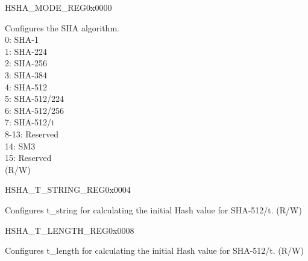 \begin{register}{H}{SHA\_MODE\_REG}{0x0000}\label{regdesc:SHAMODEREG}
%
%
\regnewline%
\begin{regdesc}\begin{reglist}
\label{fielddesc:SHAMODE}\item [SHA\_MODE] Configures the SHA algorithm. \\
0: SHA-1\\
1: SHA-224\\
2: SHA-256\\
3: SHA-384\\
4: SHA-512\\
5: SHA-512/224\\
6: SHA-512/256\\
7: SHA-512/t\\
8-13: Reserved\\
14: SM3\\
15: Reserved\\
(R/W)
\end{reglist}\end{regdesc}
\end{register}


\begin{register}{H}{SHA\_T\_STRING\_REG}{0x0004}\label{regdesc:SHATSTRINGREG}
%
\regnewline%
\begin{regdesc}\begin{reglist}
\label{fielddesc:SHATSTRING}\item [SHA\_T\_STRING] Configures t\_string for calculating the initial Hash value for SHA-512/t. (R/W)
\end{reglist}\end{regdesc}
\end{register}


\begin{register}{H}{SHA\_T\_LENGTH\_REG}{0x0008}\label{regdesc:SHATLENGTHREG}
%
%
\regnewline%
\begin{regdesc}\begin{reglist}
\label{fielddesc:SHATLENGTH}\item [SHA\_T\_LENGTH] Configures t\_length for calculating the initial Hash value for SHA-512/t. (R/W)
\end{reglist}\end{regdesc}
\end{register}

